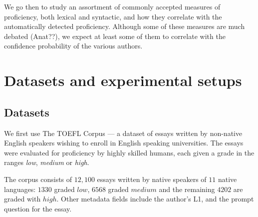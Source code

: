 \documentclass[11pt]{article}
\begin{document}
We go then to study an assortment of commonly accepted measures of proficiency, both lexical and syntactic, and how they correlate with the automatically detected proficiency. Although some of these measures are much debated (Anat??), we expect at least some of them to correlate with the confidence probability of the various authors. 



\section {Datasets and experimental setups}
\subsection{Datasets}
We first use The TOEFL Corpus \citep{tetreault2013report} --- a dataset of essays written by non-native English speakers wishing to enroll in English speaking universities. The essays were evaluated for proficiency by highly skilled humans, each given a grade in the ranges \emph{low}, \emph{medium} or \emph{high}. 

The corpus consists of $12,100$ essays written by native speakers of $11$ native languages: $1330$ graded $low$, $6568$ graded $medium$ and the remaining $4202$ are graded with $high$. Other metadata fields include the author's L1, and the prompt question for the essay.
\end{document}
